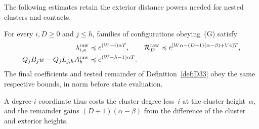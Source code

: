 The following estimates retain the exterior distance powers needed for nested clusters and contacts.
\begin{samepage}
\begin{lemma}\label{lem:J-power-separated}
For every $i,D\ge0$ and $j\le h$, families of configurations obeying~(G) satisfy
\begin{align}
\lambda_{i,\kappa}^{\rm raw}&\preccurlyeq e^{(W-i)\alpha T},&
\mathcal R_D^{\rm raw}&\preccurlyeq e^{[W\alpha-(D+1)(\alpha-\beta)+V\upsilon]T},\label{eq:J-raw-rates}\\
Q_jB_jw-Q_jL_{j,h}A^{\rm raw}_h&\preccurlyeq e^{(W-h-1)\alpha T}.&&\label{eq:J-average-error}
\end{align}
The final coefficients and tested remainder of Definition~\ref{def:D33} obey the same respective bounds, in norm before state evaluation.
\end{lemma}
\end{samepage}
A degree-$i$ coordinate thus costs the cluster degree less~$i$ at the cluster height~$\alpha$, and the remainder gains $(D+1)(\alpha-\beta)$ from the difference of the cluster and exterior heights.

